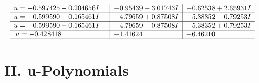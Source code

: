 \documentclass[1p]{elsarticle_modified}
\theoremstyle{definition}
\begin{document}
$$\begin{array}{c|c|c}
\begin{aligned}
u &= -0.597425 - 0.204656 I\end{aligned}
 & -0.95439 - 3.01743 I & -0.62538 + 2.65931 I \\ \hline\begin{aligned}
u &= \phantom{-}0.599590 + 0.165461 I\end{aligned}
 & -4.79659 + 0.87508 I & -5.38352 - 0.79253 I \\ \hline\begin{aligned}
u &= \phantom{-}0.599590 - 0.165461 I\end{aligned}
 & -4.79659 - 0.87508 I & -5.38352 + 0.79253 I \\ \hline\begin{aligned}
u &= -0.428418\phantom{ +0.000000I}\end{aligned}
 & -1.41624\phantom{ +0.000000I} & -6.46210\phantom{ +0.000000I}\\
 \hline 
 \end{array}$$\newpage
\newpage\renewcommand{\arraystretch}{1}
\centering \section*{ II. u-Polynomials}
\end{document}
